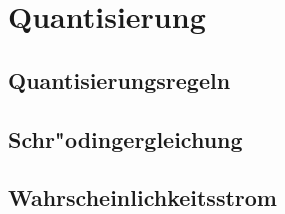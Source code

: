 \chapter{Quantisierung\label{chapter:quantisierung}}
\rhead{}

\section{Quantisierungsregeln}
\section{Schr"odingergleichung}
\section{Wahrscheinlichkeitsstrom}

